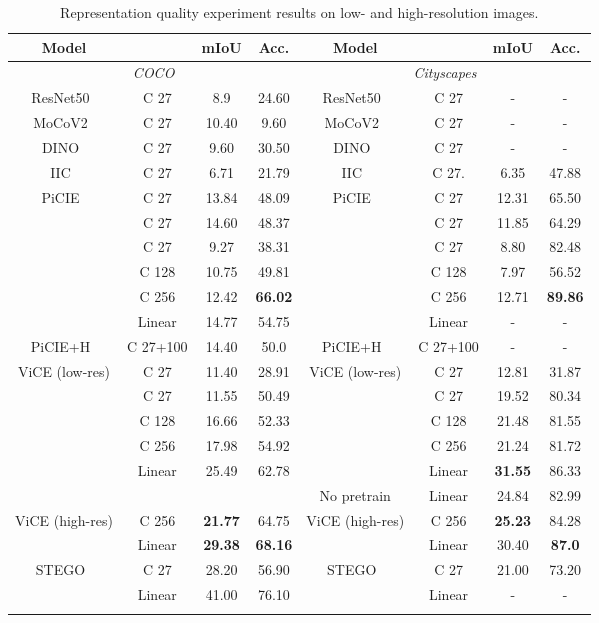 \documentclass{bmvc2k}
\begin{document}
\setlength{\tabcolsep}{4pt}
\begin{table}[ht]
\begin{center}
\caption{Representation quality experiment results on low- and high-resolution images.}
\begin{tabular}{cccc|cccc}
\hline
Model &        & mIoU  & Acc. & Model  &       & mIoU  & Acc.  \\
\hline
\multicolumn{4}{c|}{\textit{COCO}} & \multicolumn{4}{c}{\textit{Cityscapes}}\\
ResNet50~\cite{He2016ResNet50}          & C 27 & 8.9  & 24.60 &   ResNet50~\cite{He2016ResNet50} &  C 27   & -  & - \\
MoCoV2~\cite{Chen2020MoCoV2}          &  C 27 & 10.40  & 9.60 &     MoCoV2~\cite{Chen2020MoCoV2} &   C 27   & -  & - \\
DINO~\cite{Caron2021DINO}          & C 27 & 9.60  & 30.50 &  DINO~\cite{Caron2021DINO}   & C 27  & -  & - \\
IIC~\cite{Ji2019IIC}          & C 27 & 6.71  & 21.79 & IIC~\cite{Ji2019IIC}  &     C 27.     & 6.35  & 47.88 \\
PiCIE~\cite{Cho2021PiCIE} & C 27   & 13.84 & 48.09 & PiCIE~\cite{Cho2021PiCIE} & C 27   & 12.31 & 65.50 \\
  & C 27   & 14.60 & 48.37 &   & C 27  & 11.85 & 64.29 \\
  & C 27   & 9.27 & 38.31 &   & C 27  & 8.80 & 82.48 \\
& C 128   & 10.75 & 49.81 &  & C 128   & 7.97 & 56.52 \\
 & C 256   & 12.42 & \textbf{66.02} &  & C 256   & 12.71 & \textbf{89.86} \\
 & Linear   & 14.77 & 54.75 &  & Linear  & - & - \\
PiCIE+H~\cite{Cho2021PiCIE} & C 27+100  & 14.40 & 50.0 & PiCIE+H~\cite{Cho2021PiCIE} & C 27+100 & - & - \\
ViCE (low-res) & C 27   & 11.40 & 28.91 & ViCE (low-res) & C 27 &  12.81 & 31.87 \\
 & C 27   & 11.55 & 50.49 & & C 27   & 19.52 & 80.34 \\
& C 128   & 16.66 & 52.33 &  & C 128   & 21.48 & 81.55 \\
 & C 256   & 17.98 & 54.92 &  & C 256   & 21.24 & 81.72 \\
 & Linear   & 25.49 & 62.78 &  & Linear  & \textbf{31.55} & 86.33 \\
 & & & & No pretrain & Linear  & 24.84 & 82.99 \\
 ViCE (high-res) & C 256   & \textbf{21.77} & 64.75 & ViCE (high-res) & C 256 &  \textbf{25.23} & 84.28 \\
 & Linear   & \textbf{29.38} & \textbf{68.16} &  & Linear  & 30.40 & \textbf{87.0} \\
STEGO~\cite{Hamilton2022STEGO} & C 27   & 28.20 & 56.90 & STEGO~\cite{Hamilton2022STEGO} & C 27   & 21.00 & 73.20 \\
 & Linear   & 41.00 & 76.10 &  & Linear  & - & - \\
\hline\noalign{\smallskip}
\label{tab:low-res_results}
\end{tabular}
\end{center}
\end{table}
\setlength{\tabcolsep}{1.4pt}
\end{document}
